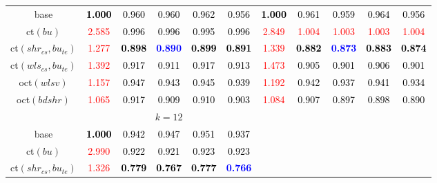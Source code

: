 \begin{tabular}[t]{c|>{}cccc>{}c|ccccc}
base & \textcolor{black}{\textbf{1.000}} & \textcolor{black}{0.960} & \textcolor{black}{0.960} & \textcolor{black}{0.962} & \textcolor{black}{0.956} & \textcolor{black}{\textbf{1.000}} & \textcolor{black}{0.961} & \textcolor{black}{0.959} & \textcolor{black}{0.964} & \textcolor{black}{0.956}\\
ct$(bu)$ & \textcolor{red}{2.585} & \textcolor{black}{0.996} & \textcolor{black}{0.996} & \textcolor{black}{0.995} & \textcolor{black}{0.996} & \textcolor{red}{2.849} & \textcolor{red}{1.004} & \textcolor{red}{1.003} & \textcolor{red}{1.003} & \textcolor{red}{1.004}\\
ct$(shr_{cs}, bu_{te})$ & \textcolor{red}{1.277} & \textcolor{black}{\textbf{0.898}} & \textcolor{blue}{\textbf{0.890}} & \textcolor{black}{\textbf{0.899}} & \textcolor{black}{\textbf{0.891}} & \textcolor{red}{1.339} & \textcolor{black}{\textbf{0.882}} & \textcolor{blue}{\textbf{0.873}} & \textcolor{black}{\textbf{0.883}} & \textcolor{black}{\textbf{0.874}}\\
ct$(wls_{cs}, bu_{te})$ & \textcolor{red}{1.392} & \textcolor{black}{0.917} & \textcolor{black}{0.911} & \textcolor{black}{0.917} & \textcolor{black}{0.913} & \textcolor{red}{1.473} & \textcolor{black}{0.905} & \textcolor{black}{0.901} & \textcolor{black}{0.906} & \textcolor{black}{0.901}\\
oct$(wlsv)$ & \textcolor{red}{1.157} & \textcolor{black}{0.947} & \textcolor{black}{0.943} & \textcolor{black}{0.945} & \textcolor{black}{0.939} & \textcolor{red}{1.192} & \textcolor{black}{0.942} & \textcolor{black}{0.937} & \textcolor{black}{0.941} & \textcolor{black}{0.934}\\
oct$(bdshr)$ & \textcolor{red}{1.065} & \textcolor{black}{0.917} & \textcolor{black}{0.909} & \textcolor{black}{0.910} & \textcolor{black}{0.903} & \textcolor{red}{1.084} & \textcolor{black}{0.907} & \textcolor{black}{0.897} & \textcolor{black}{0.898} & \textcolor{black}{0.890}\\
\addlinespace[0.3em]
\multicolumn{1}{c}{} & \multicolumn{5}{c}{\textbf{$k = 12$}} & \multicolumn{5}{c}{}\\
base & \textcolor{black}{\textbf{1.000}} & \textcolor{black}{0.942} & \textcolor{black}{0.947} & \textcolor{black}{0.951} & \textcolor{black}{0.937} &  &  &  &  & \\
ct$(bu)$ & \textcolor{red}{2.990} & \textcolor{black}{0.922} & \textcolor{black}{0.921} & \textcolor{black}{0.923} & \textcolor{black}{0.923} &  &  &  &  & \\
ct$(shr_{cs}, bu_{te})$ & \textcolor{red}{1.326} & \textcolor{black}{\textbf{0.779}} & \textcolor{black}{\textbf{0.767}} & \textcolor{black}{\textbf{0.777}} & \textcolor{blue}{\textbf{0.766}} &  &  &  &  & \\

\end{tabular}
